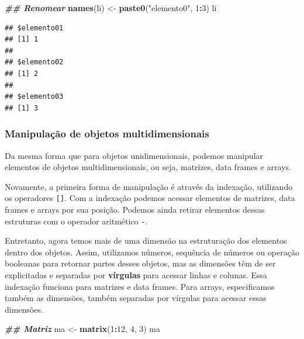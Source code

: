 \documentclass[
]{article}
\newenvironment{Shaded}{\begin{snugshade}}{\end{snugshade}}
\newcommand{\DecValTok}[1]{\textcolor[rgb]{0.00,0.00,0.81}{#1}}
\newcommand{\DocumentationTok}[1]{\textcolor[rgb]{0.56,0.35,0.01}{\textbf{\textit{#1}}}}
\newcommand{\FunctionTok}[1]{\textcolor[rgb]{0.13,0.29,0.53}{\textbf{#1}}}
\newcommand{\NormalTok}[1]{#1}
\newcommand{\OtherTok}[1]{\textcolor[rgb]{0.56,0.35,0.01}{#1}}
\newcommand{\SpecialCharTok}[1]{\textcolor[rgb]{0.81,0.36,0.00}{\textbf{#1}}}
\newcommand{\StringTok}[1]{\textcolor[rgb]{0.31,0.60,0.02}{#1}}
\begin{document}
\begin{Shaded}
\begin{Highlighting}[]
\DocumentationTok{\#\# Renomear}
\FunctionTok{names}\NormalTok{(li) }\OtherTok{\textless{}{-}} \FunctionTok{paste0}\NormalTok{(}\StringTok{"elemento0"}\NormalTok{, }\DecValTok{1}\SpecialCharTok{:}\DecValTok{3}\NormalTok{)}
\NormalTok{li}
\end{Highlighting}
\end{Shaded}

\begin{verbatim}
## $elemento01
## [1] 1
## 
## $elemento02
## [1] 2
## 
## $elemento03
## [1] 3
\end{verbatim}

\hypertarget{manipulauxe7uxe3o-de-objetos-multidimensionais}{%
\subsubsection{Manipulação de objetos multidimensionais}\label{manipulauxe7uxe3o-de-objetos-multidimensionais}}

Da mesma forma que para objetos unidimensionais, podemos manipular elementos de objetos multidimensionais, ou seja, matrizes, data frames e arrays.

Novamente, a primeira forma de manipulação é através da indexação, utilizando os operadores \texttt{{[}{]}}. Com a indexação podemos acessar elementos de matrizes, data frames e arrays por sua posição. Podemos ainda retirar elementos dessas estruturas com o operador aritmético \texttt{-}.

Entretanto, agora temos mais de uma dimensão na estruturação dos elementos dentro dos objetos. Assim, utilizamos números, sequência de números ou operação booleanas para retornar partes desses objetos, mas as dimensões têm de ser explicitadas e separadas por \textbf{vírgulas} para acessar linhas e colunas. Essa indexação funciona para matrizes e data frames. Para arrays, especificamos também as dimensões, também separadas por vírgulas para acessar essas dimensões.

\begin{Shaded}
\begin{Highlighting}[]
\DocumentationTok{\#\# Matriz}
\NormalTok{ma }\OtherTok{\textless{}{-}} \FunctionTok{matrix}\NormalTok{(}\DecValTok{1}\SpecialCharTok{:}\DecValTok{12}\NormalTok{, }\DecValTok{4}\NormalTok{, }\DecValTok{3}\NormalTok{)}
\NormalTok{ma}
\end{Highlighting}
\end{Shaded}
\end{document}
